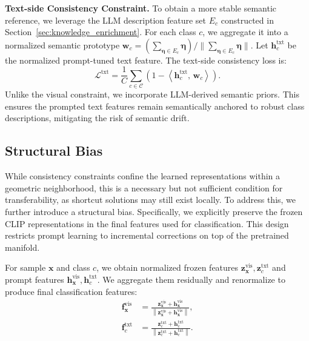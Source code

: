 \documentclass{article}
\theoremstyle{plain}
\theoremstyle{definition}
\theoremstyle{remark}
\begin{document}
	\textbf{Text-side Consistency Constraint.}
	To obtain a more stable semantic reference, we leverage the LLM description feature set $E_c$ constructed in Section~\ref{sec:knowledge_enrichment}. For each class $c$, we aggregate it into a normalized semantic prototype $\mathbf{w}_{c}=(\sum_{\boldsymbol{\eta}\in E_c} \boldsymbol{\eta})/\|\sum_{\boldsymbol{\eta}\in E_c} \boldsymbol{\eta}\|$.
	Let $\mathbf{h}^{\mathrm{txt}}_{c}$ be the normalized prompt-tuned text feature. The text-side consistency loss is:
	\begin{equation}
		\mathcal{L}^{\mathrm{txt}}
		=
		\frac{1}{C}\sum_{c\in \mathcal{C}}
		\left(1-\left\langle \mathbf{h}^{\mathrm{txt}}_{c},\, \mathbf{w}_{c}\right\rangle\right).
	\end{equation}
	Unlike the visual constraint, we incorporate LLM-derived semantic priors. This ensures the prompted text features remain semantically anchored to robust class descriptions, mitigating the risk of semantic drift.
	
	\subsection{Structural Bias}
	\label{sec:structural_bias}
	While consistency constraints confine the learned representations within a geometric neighborhood, this is a necessary but not sufficient condition for transferability, as shortcut solutions may still exist locally. To address this, we further introduce a structural bias. Specifically, we explicitly preserve the frozen CLIP representations in the final features used for classification. This design restricts prompt learning to incremental corrections on top of the pretrained manifold.
	
	For sample $\mathbf{x}$ and class $c$, we obtain normalized frozen features $\mathbf{z}^{\mathrm{vis}}_{\mathbf{x}}, \mathbf{z}^{\mathrm{txt}}_{c}$ and prompt features $\mathbf{h}^{\mathrm{vis}}_{\mathbf{x}}, \mathbf{h}^{\mathrm{txt}}_{c}$. We aggregate them residually and renormalize to produce final classification features:
	\begin{equation}
		\label{eq:fused_features}
		\begin{aligned}
			\mathbf{f}^{\mathrm{vis}}_{\mathbf{x}}
			&=
			\frac{\mathbf{z}^{\mathrm{vis}}_{\mathbf{x}}+\mathbf{h}^{\mathrm{vis}}_{\mathbf{x}}}
			{\left\|\mathbf{z}^{\mathrm{vis}}_{\mathbf{x}}+\mathbf{h}^{\mathrm{vis}}_{\mathbf{x}}\right\|},\\
			\mathbf{f}^{\mathrm{txt}}_{c}
			&=
			\frac{\mathbf{z}^{\mathrm{txt}}_{c}+\mathbf{h}^{\mathrm{txt}}_{c}}
			{\left\|\mathbf{z}^{\mathrm{txt}}_{c}+\mathbf{h}^{\mathrm{txt}}_{c}\right\|}.
		\end{aligned}
	\end{equation}
	
\end{document}
